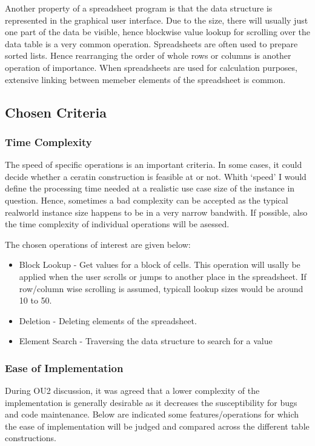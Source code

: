 \documentclass[a4paper,11pt,twoside]{article}
\begin{document}
Another property of a spreadsheet program is that the data
structure is represented in the graphical user interface. Due to the
size, there will usually just one part of the data be visible, hence
blockwise value lookup for scrolling over the data table is a very
common operation. Spreadsheets are often used to prepare sorted
lists. Hence rearranging the order of whole rows or columns is another
operation of importance. When spreadsheets are used for calculation
purposes, extensive linking between memeber elements of the
spreadsheet is common.


\subsection{Chosen Criteria}
\subsubsection{Time Complexity}
The speed of specific operations is an important criteria. In some
cases, it could decide whether a ceratin construction is feasible at
or not. Whith `speed' I would define the processing time needed at a
realistic use case size of the instance in question. Hence, sometimes
a bad complexity can be accepted as the typical realworld instance
size happens to be in a very narrow bandwith.
If possible, also the time complexity of individual operations will be
asessed.    

The chosen operations of interest are given below:

\begin{itemize}
\item Block Lookup - Get values for a block of cells. This operation
  will usally be applied when the user scrolls or jumps to another
  place in the spreadsheet. If row/column wise scrolling is assumed,
  typicall lookup sizes would be around 10 to 50. 
\item Deletion - Deleting elements of the spreadsheet.
\item Element Search - Traversing the data structure to search for a value
\end{itemize}

\subsubsection{Ease of Implementation}
During OU2 discussion, it was agreed that a lower complexity
of the implementation is generally desirable as it decreases the
susceptibility for bugs and code maintenance. Below are indicated some
features/operations for which the ease of implementation will be
judged and compared across the different table constructions.
\end{document}
